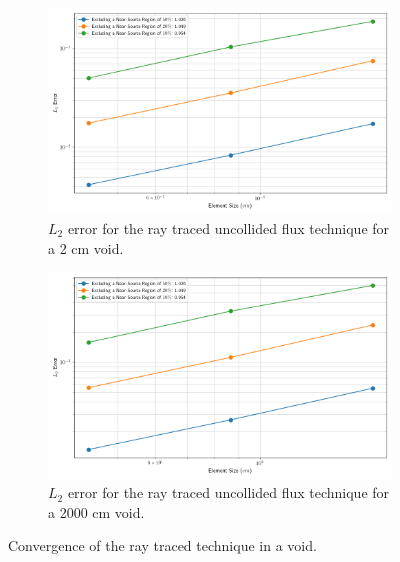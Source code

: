 \begin{figure}[H]
    \centering
    \begin{subfigure}[b]{\textwidth}
        \centering
        \includegraphics[width=\textwidth]{images/verification/rt_anal/vacuum_point_source_convergence_2.png}
        \caption{$L_{2}$ error for the ray traced uncollided flux technique for a 2 cm void.}
        \label{fig:verification:rt:void:2}
    \end{subfigure}
    \hfill
    \begin{subfigure}[b]{\textwidth}
        \centering
        \includegraphics[width=\textwidth]{images/verification/rt_anal/vacuum_point_source_convergence_2000.png}
        \caption{$L_{2}$ error for the ray traced uncollided flux technique for a 2000 cm void.}
        \label{fig:verification:rt:void:2000}
    \end{subfigure}
    \caption{Convergence of the ray traced technique in a void.}
    \label{fig:verification:rt:void}
\end{figure}

